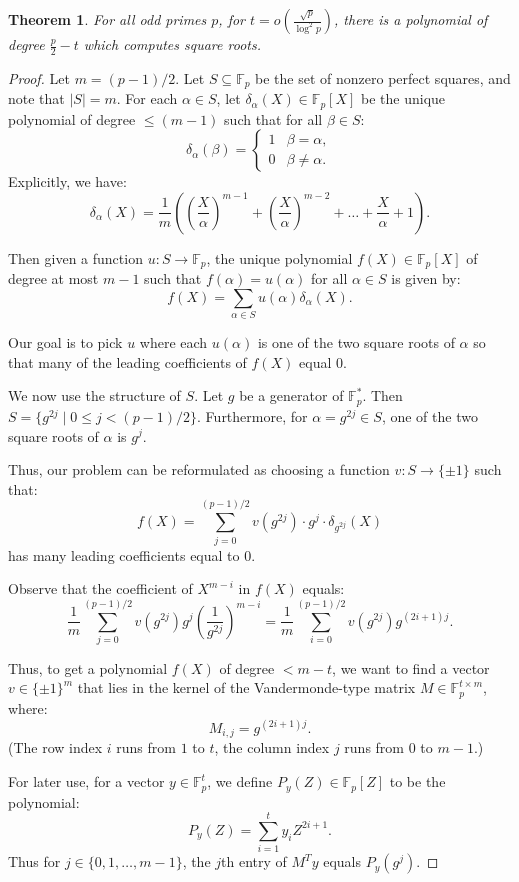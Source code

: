 \documentclass{article}
\newtheorem{theorem}{Theorem}[section]
\newcommand{\F}{\mathbb{F}}
\begin{document}
\begin{theorem}
 For all odd primes $p$, for $t = o\left(\frac{\sqrt{p}}{\log^2 p} \right)$, there is a polynomial of degree $\frac{p}{2} - t$ which computes square roots.
\end{theorem}
\begin{proof}
Let $m = (p-1)/2$. Let $S \subseteq \F_p$ be the set of nonzero perfect squares,
and note that $|S| = m$.
For each $\alpha \in S$, let $\delta_\alpha(X) \in \F_p[X]$ be
the unique polynomial of degree $\leq (m-1)$ such that for all $\beta\in S$:
$$ \delta_\alpha(\beta) =  \begin{cases} 1  & \beta = \alpha, \\ 0 & \beta \neq \alpha. \end{cases}$$
Explicitly, we have:
$$\delta_\alpha(X) = \frac{1}{m} \left( \left(\frac{X}{\alpha}\right)^{m-1} + \left(\frac{X}{\alpha}\right)^{m-2} + \ldots + \frac{X}{\alpha} + 1 \right).$$


Then given a function $u: S \to \F_p$, 
the unique polynomial $f(X) \in \F_p[X]$ of degree at most $m-1$
such that $f(\alpha) = u(\alpha)$ for all $\alpha \in S$ is given by:
$$f(X) =  \sum_{\alpha \in S} u(\alpha) \delta_\alpha(X).$$

Our goal is to pick $u$ where each $u(\alpha)$ is one of the two square roots of $\alpha$ so that many of the leading coefficients of $f(X)$ equal $0$.

We now use the structure of $S$. Let $g$ be a generator of $\F_p^*$. 
Then $S = \{g^{2j} \mid  0 \leq j < (p-1)/2 \}$. Furthermore, 
for $\alpha = g^{2j} \in S$, one of the two square roots of $\alpha$
is $g^{j}$.

Thus, our problem can be reformulated as choosing a function
$v: S \to \{\pm 1 \}$ such that:
$$ f(X) = \sum_{j=0}^{(p-1)/2} v\left(g^{2j}\right)\cdot g^j \cdot \delta_{g^{2j}}(X)$$
has many leading coefficients equal to $0$.

Observe that the coefficient of $X^{m-i}$ in $f(X)$ equals:
$$ \frac{1}{m} \sum_{j=0}^{(p-1)/2} v(g^{2j}) g^{j} \left( \frac{1}{g^{2j}} \right)^{m-i} = 
 \frac{1}{m} \sum_{i=0}^{(p-1)/2} v(g^{2j}) g^{(2i+1)j}.$$


 Thus, to get a polynomial $f(X)$ of degree $< m-t$, we want to find a vector $v \in \{\pm 1\}^m$ that lies in the kernel of the Vandermonde-type matrix $M \in \F_p^{t \times m}$, where:
 $$ M_{i,j} = g^{(2i+1)j}.$$
 (The row index $i$ runs from $1$ to $t$, the column index $j$ runs from $0$ to $m-1$.)
 
 For later use, for a vector $y \in \F_p^t$, we define $P_y(Z) \in \F_p[Z]$ to be the polynomial:
 $$ P_y(Z) = \sum_{i = 1}^{t} y_i Z^{2i+1}.$$
 Thus for $j \in \{0, 1, \ldots, m-1 \}$, the $j$th entry of $M^Ty$ equals $P_y(g^{j})$.



\end{proof}
\end{document}
